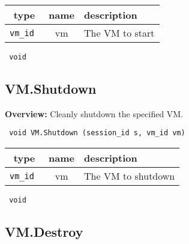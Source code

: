 
 
\vspace{0.3cm}
\begin{tabular}{|c|c|p{7cm}|}
 \hline
{\bf type} & {\bf name} & {\bf description} \\ \hline
{\tt vm\_id } & vm & The VM to start \\ \hline 

\end{tabular}

\vspace{0.3cm}

{\tt 
void
}



\vspace{0.3cm}
\vspace{0.3cm}
\vspace{0.3cm}

\subsection{VM.Shutdown}

{\bf Overview:} 
Cleanly shutdown the specified VM.

\begin{verbatim} void VM.Shutdown (session_id s, vm_id vm)\end{verbatim}



 
\vspace{0.3cm}
\begin{tabular}{|c|c|p{7cm}|}
 \hline
{\bf type} & {\bf name} & {\bf description} \\ \hline
{\tt vm\_id } & vm & The VM to shutdown \\ \hline 

\end{tabular}

\vspace{0.3cm}

{\tt 
void
}



\vspace{0.3cm}
\vspace{0.3cm}
\vspace{0.3cm}

\subsection{VM.Destroy}

